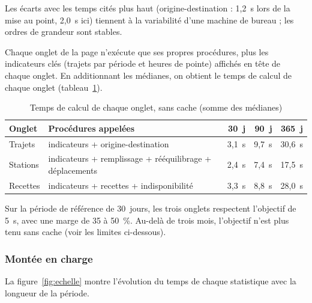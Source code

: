 Les écarts avec les temps cités plus haut (origine-destination : 1,2~s lors de la mise au point, 2,0~s ici) tiennent à la variabilité d'une machine de bureau ; les ordres de grandeur sont stables.

Chaque onglet de la page n'exécute que ses propres procédures, plus les indicateurs clés (trajets par période et heures de pointe) affichés en tête de chaque onglet. En additionnant les médianes, on obtient le temps de calcul de chaque onglet (tableau~\ref{tab:onglets}).

\begin{table}[htbp]\centering
	\begin{tabular}{lp{7.2cm}rrr}
		\toprule
		Onglet & Procédures appelées & 30~j & 90~j & 365~j \\
		\midrule
		Trajets & indicateurs + origine-destination & 3,1~s & 9,7~s & 30,6~s \\
		Stations & indicateurs + remplissage + rééquilibrage + déplacements & 2,4~s & 7,4~s & 17,5~s \\
		Recettes & indicateurs + recettes + indisponibilité & 3,3~s & 8,8~s & 28,0~s \\
		\bottomrule
	\end{tabular}
	\caption{Temps de calcul de chaque onglet, sans cache (somme des médianes)}\label{tab:onglets}
\end{table}

Sur la période de référence de 30~jours, les trois onglets respectent l'objectif de 5~s, avec une marge de 35 à 50~\%. Au-delà de trois mois, l'objectif n'est plus tenu sans cache (voir les limites ci-dessous).

\subsubsection{Montée en charge}

La figure~\ref{fig:echelle} montre l'évolution du temps de chaque statistique avec la longueur de la période.

